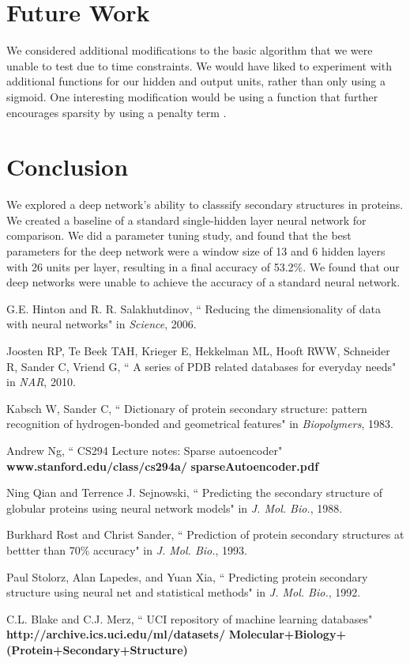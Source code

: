 \documentclass[letterpaper,twocolumn,12pt]{article}
\begin{document}
\section{Future Work}
We considered additional modifications to the basic algorithm that we were unable to test due to time constraints.
We would have liked to experiment with additional functions for our hidden and output units, rather than only using a sigmoid.
One interesting modification would be using a function that further encourages sparsity by using a penalty term \cite{ng}.

\section{Conclusion}
We explored a deep network's ability to classsify secondary structures in proteins.
We created a baseline of a standard single-hidden layer neural network for comparison.
We did a parameter tuning study, and found that the best parameters for the deep network were a window size of 13 and 6 hidden layers with 26 units per layer, resulting in a final accuracy of 53.2\%.
We found that our deep networks were unable to achieve the accuracy of a standard neural network.

\begin{thebibliography}{9}


G.E. Hinton and R. R. Salakhutdinov,
   `` Reducing the dimensionality of data with neural networks"
   in \emph{Science}, 2006.

Joosten RP, Te Beek TAH, Krieger E, Hekkelman ML, Hooft RWW, Schneider R, Sander C, Vriend G,
   `` A series of PDB related databases for everyday needs"
   in \emph{NAR}, 2010.

Kabsch W, Sander C,
   `` Dictionary of protein secondary structure: pattern recognition of hydrogen-bonded and geometrical features"
   in \emph{Biopolymers}, 1983.

Andrew Ng,
   `` CS294 Lecture notes: Sparse autoencoder"
   \textbf{www.stanford.edu/class/cs294a/}
   \textbf{sparseAutoencoder.pdf}

Ning Qian and Terrence J. Sejnowski,
  `` Predicting the secondary structure of globular proteins using neural network models"
  in \emph{J. Mol. Bio.}, 1988.

Burkhard Rost and Christ Sander,
  `` Prediction of protein secondary structures at bettter than 70\% accuracy"
  in \emph{J. Mol. Bio.}, 1993.

Paul Stolorz, Alan Lapedes, and Yuan Xia,
   `` Predicting protein secondary structure using neural net and statistical methods"
   in \emph{J. Mol. Bio.}, 1992.

   C.L. Blake and C.J. Merz,
   `` UCI repository of machine learning databases"
   \textbf{http://archive.ics.uci.edu/ml/datasets/}
   \textbf{Molecular+Biology+}
   \textbf{(Protein+Secondary+Structure)}

\end{thebibliography}
\end{document}
